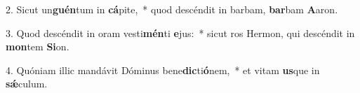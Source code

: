 2. Sicut un\textbf{guén}tum in \textbf{cá}pite,~*  quod descéndit in barbam, \textbf{bar}bam \textbf{A}aron.\

3. Quod descéndit in oram vesti\textbf{mén}ti \textbf{e}jus:~*  sicut ros Hermon, qui descéndit in \textbf{mon}tem \textbf{Si}on.\

4. Quóniam illic mandávit Dóminus bene\textbf{dic}ti\textbf{ó}nem,~*  et vitam \textbf{us}que in \textbf{sǽ}culum.\


